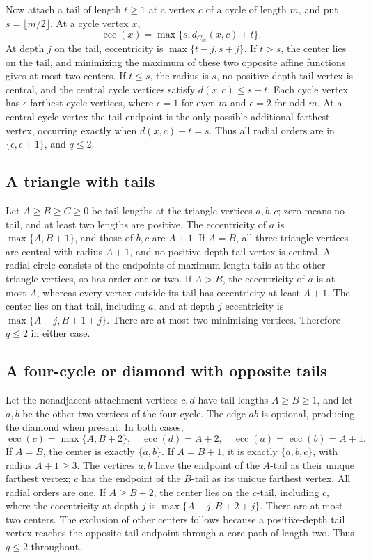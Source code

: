 \documentclass[11pt,a4paper]{article}
\theoremstyle{definition}\newtheorem{definition}[theorem]{Definition}
\theoremstyle{remark}\newtheorem{remark}[theorem]{Remark}
\begin{document}
Now attach a tail of length $t\ge1$ at a vertex $c$ of a cycle of length
$m$, and put $s=\lfloor m/2\rfloor$. At a cycle vertex $x$,
\[
 \operatorname{ecc}(x)=\max\{s,d_{C_m}(x,c)+t\}.
\]
At depth $j$ on the tail, eccentricity is $\max\{t-j,s+j\}$.
If $t>s$, the center lies on the tail, and minimizing the maximum of
these two opposite affine functions gives at most two centers.
If $t\le s$, the radius is $s$, no positive-depth tail vertex is
central, and the central cycle vertices satisfy $d(x,c)\le s-t$.
Each cycle vertex has $\epsilon$ farthest cycle vertices, where
$\epsilon=1$ for even $m$ and $\epsilon=2$ for odd $m$. At a central
cycle vertex the tail endpoint is the only possible additional farthest
vertex, occurring exactly when $d(x,c)+t=s$. Thus all radial orders are
in $\{\epsilon,\epsilon+1\}$, and $q\le2$.

\subsection{A triangle with tails}
Let $A\ge B\ge C\ge0$ be tail lengths at the triangle vertices $a,b,c$;
zero means no tail, and at least two lengths are positive. The
eccentricity of $a$ is $\max\{A,B+1\}$, and those of $b,c$ are $A+1$.
If $A=B$, all three triangle vertices are central with radius $A+1$,
and no positive-depth tail vertex is central. A radial circle consists
of the endpoints of maximum-length tails at the other triangle vertices,
so has order one or two.
If $A>B$, the eccentricity of $a$ is at most $A$, whereas every vertex
outside its tail has eccentricity at least $A+1$. The center lies on
that tail, including $a$, and at depth $j$ eccentricity is
$\max\{A-j,B+1+j\}$. There are at most two minimizing vertices.
Therefore $q\le2$ in either case.

\subsection{A four-cycle or diamond with opposite tails}
Let the nonadjacent attachment vertices $c,d$ have tail lengths
$A\ge B\ge1$, and let $a,b$ be the other two vertices of the four-cycle.
The edge $ab$ is optional, producing the diamond when present. In both
cases,
\[
 \operatorname{ecc}(c)=\max\{A,B+2\},\quad
 \operatorname{ecc}(d)=A+2,\quad
 \operatorname{ecc}(a)=\operatorname{ecc}(b)=A+1.
\]
If $A=B$, the center is exactly $\{a,b\}$. If $A=B+1$, it is exactly
$\{a,b,c\}$, with radius $A+1\ge3$. The vertices $a,b$ have the endpoint
of the $A$-tail as their unique farthest vertex; $c$ has the endpoint of
the $B$-tail as its unique farthest vertex. All radial orders are one.
If $A\ge B+2$, the center lies on the $c$-tail, including $c$, where the
eccentricity at depth $j$ is $\max\{A-j,B+2+j\}$. There are at most two
centers. The exclusion of other centers follows because a positive-depth
tail vertex reaches the opposite tail endpoint through a core path of
length two. Thus $q\le2$ throughout.
\end{document}
